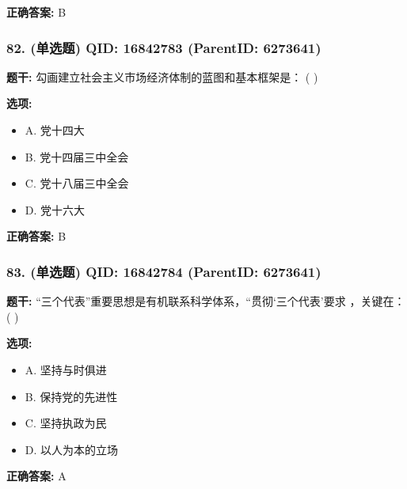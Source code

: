 \documentclass[12pt,UTF8]{ctexart}
\begin{document}
\textbf{正确答案:}
B

\vspace{0.3em}\hrulefill\vspace{0.7em}

\subsubsection*{82. (单选题) \small QID: 16842783 (ParentID: 6273641)}

\textbf{题干:}
勾画建立社会主义市场经济体制的蓝图和基本框架是： ( )



\textbf{选项:}
\begin{itemize}[leftmargin=*]

  \item A. 党十四大

  \item B. 党十四届三中全会

  \item C. 党十八届三中全会

  \item D. 党十六大

\end{itemize}

\textbf{正确答案:}
B

\vspace{0.3em}\hrulefill\vspace{0.7em}

\subsubsection*{83. (单选题) \small QID: 16842784 (ParentID: 6273641)}

\textbf{题干:}
“三个代表”重要思想是有机联系科学体系，“贯彻‘三个代表’要求 ，关键在： ( )



\textbf{选项:}
\begin{itemize}[leftmargin=*]

  \item A. 坚持与时俱进

  \item B. 保持党的先进性

  \item C. 坚持执政为民

  \item D. 以人为本的立场

\end{itemize}

\textbf{正确答案:}
A
\end{document}
